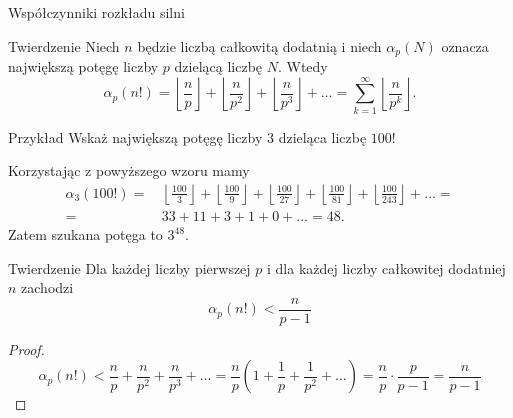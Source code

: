 \documentclass[a4paper,10pt]{beamer}
\begin{document}
\begin{frame}{Współczynniki rozkładu silni}

\begin{block}{Twierdzenie}
Niech $n$ będzie liczbą całkowitą dodatnią i niech $\alpha_p(N)$ oznacza największą potęgę liczby $p$ dzielącą liczbę $N$. Wtedy
$$\alpha_p(n!)=\left\lfloor\frac{n}p\right\rfloor+\left\lfloor\frac{n}{p^2}\right\rfloor+\left\lfloor\frac{n}{p^3}\right\rfloor+\ldots=\sum\limits_{k=1}^\infty\left\lfloor\frac{n}{p^k}\right\rfloor.$$
\end{block}

\begin{exampleblock}{Przykład}
Wskaż największą potęgę liczby $3$ dzieląca liczbę $100!$

\bigskip

Korzystając z powyższego wzoru mamy
\begin{align*}
\alpha_3(100!)=&\,\left\lfloor\frac{100}{3}\right\rfloor+\left\lfloor\frac{100}{9}\right\rfloor+\left\lfloor\frac{100}{27}\right\rfloor+\left\lfloor\frac{100}{81}\right\rfloor+\left\lfloor\frac{100}{243}\right\rfloor+\ldots=\\
=&\,33+11+3+1+0+\ldots=48.
\end{align*}
Zatem szukana potęga to $3^{48}$.
\end{exampleblock}


\end{frame}

\begin{frame}

\begin{block}{Twierdzenie}
Dla każdej liczby pierwszej $p$ i dla każdej liczby całkowitej dodatniej $n$ zachodzi $$\alpha_p(n!)<\frac{n}{p-1}$$
\end{block}

\begin{proof}
$$\alpha_p(n!)<\frac{n}p+\frac{n}{p^2}+\frac{n}{p^3}+\ldots=\frac{n}{p}\left(1+\frac1p+\frac1{p^2}+\ldots\right)=\frac{n}p\cdot\frac{p}{p-1}=\frac{n}{p-1}$$
\end{proof}

\end{frame}
\end{document}
